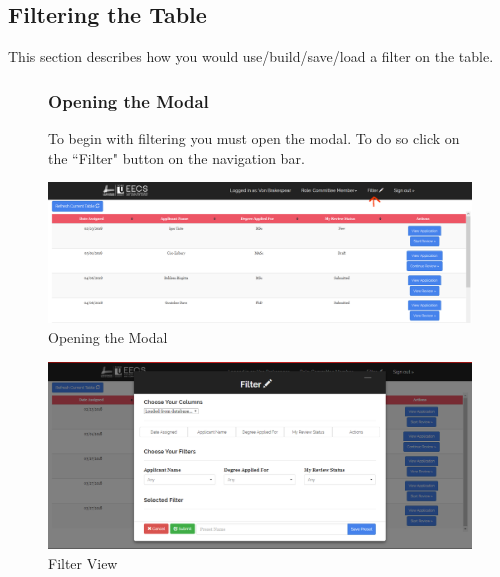 \documentclass[fontsize=12pt,paper=letter,twoside]{scrartcl}
\begin{document}
\subsection{Filtering the Table}
This section describes how you would use/build/save/load a filter on the table.
\begin{figure}[!htb]
\subsubsection{Opening the Modal}
To begin with filtering you must open the modal. To do so click on the ``Filter" button on the navigation bar.
\begin{center}
\includegraphics[width=.99\textwidth]{images/open_modal.png}
\end{center}
\caption{Opening the  Modal}
\label{fig:open_modal}
\end{figure}

\begin{figure}[!htb]
\begin{center}
\includegraphics[width=.99\textwidth]{images/default_filter_view.png}
\end{center}
\caption{Filter View}
\label{fig:filter_view}
\end{figure}

\clearpage
\newpage
\end{document}
